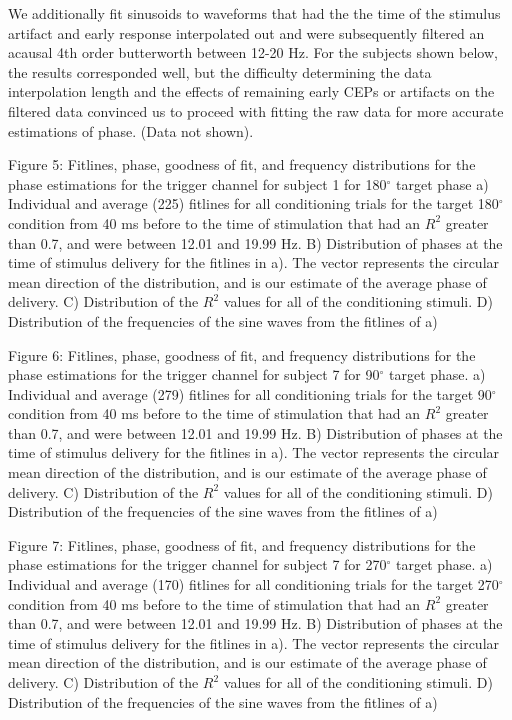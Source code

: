 We additionally fit sinusoids to waveforms that had the the time of the stimulus artifact and early response interpolated out and were subsequently filtered an acausal 4th order butterworth between 12-20 Hz. For the subjects shown below, the results corresponded well, but the difficulty determining the data interpolation length and the effects of remaining early CEPs or artifacts on the filtered data convinced us to proceed with fitting the raw data for more accurate estimations of phase. (Data not shown).


Figure 5: Fitlines, phase, goodness of fit, and frequency distributions for the phase estimations for the trigger channel for subject 1 for 180$^\circ$ target phase
a) Individual and average (225) fitlines for all conditioning trials for the target 180$^\circ$ condition from 40 ms before to the time of stimulation that had an $R^2$ greater than 0.7, and were between 12.01 and 19.99 Hz. B) Distribution of phases at the time of stimulus delivery for the fitlines in a). The vector represents the circular mean direction of the distribution, and is our estimate of the average phase of delivery. C) Distribution of the $R^2$ values for all of the conditioning stimuli. D) Distribution of the frequencies of the sine waves from the fitlines of a)



Figure 6: Fitlines, phase, goodness of fit, and frequency distributions for the phase estimations for the trigger channel for subject 7 for 90$^\circ$ target phase. 
a) Individual and average (279) fitlines for all conditioning trials for the target 90$^\circ$ condition from 40 ms before to the time of stimulation that had an $R^2$ greater than 0.7, and were between 12.01 and 19.99 Hz. B) Distribution of phases at the time of stimulus delivery for the fitlines in a). The vector represents the circular mean direction of the distribution, and is our estimate of the average phase of delivery. C) Distribution of the $R^2$ values for all of the conditioning stimuli. D) Distribution of the frequencies of the sine waves from the fitlines of a)



Figure 7: Fitlines, phase, goodness of fit, and frequency distributions for the phase estimations for the trigger channel for subject 7 for 270$^\circ$ target phase. 
a) Individual and average (170) fitlines for all conditioning trials for the target 270$^\circ$ condition from 40 ms before to the time of stimulation that had an $R^2$ greater than 0.7, and were between 12.01 and 19.99 Hz. B) Distribution of phases at the time of stimulus delivery for the fitlines in a). The vector represents the circular mean direction of the distribution, and is our estimate of the average phase of delivery. C) Distribution of the $R^2$ values for all of the conditioning stimuli. D) Distribution of the frequencies of the sine waves from the fitlines of a)



